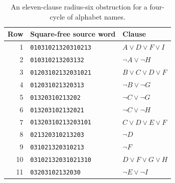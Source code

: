 \documentclass[11pt]{article}
\theoremstyle{remark}
\begin{document}
\begin{table}[htbp]
\centering
\small
\begin{tabular}{@{}rll@{}}
\toprule
Row & Square-free source word & Clause\\
\midrule
1 & \texttt{01031021320310213} & $A\vee D\vee F\vee I$\\
2 & \texttt{010310213203132} & $\neg A\vee\neg H$\\
3 & \texttt{01203102132031021} & $B\vee C\vee D\vee F$\\
4 & \texttt{012031021320313} & $\neg B\vee\neg G$\\
5 & \texttt{01320310213202} & $\neg C\vee\neg G$\\
6 & \texttt{013203102132021} & $\neg C\vee\neg H$\\
7 & \texttt{01320310213203101} & $C\vee D\vee E\vee F$\\
8 & \texttt{021320310213203} & $\neg D$\\
9 & \texttt{031021320310213} & $\neg F$\\
10 & \texttt{03102132031021310} & $D\vee F\vee G\vee H$\\
11 & \texttt{03203102132030} & $\neg E\vee\neg I$\\
\bottomrule
\end{tabular}
\caption{An eleven-clause radius-six obstruction
for a four-cycle of alphabet names.}
\label{tab:c4-core}
\end{table}
\end{document}
